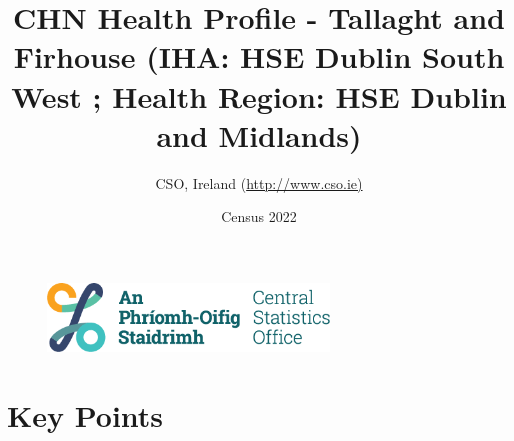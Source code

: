 \documentclass{article}
\title{CHN Health Profile - Tallaght and Firhouse (IHA: HSE Dublin South West ;  Health Region: HSE Dublin and Midlands) }
\date{Census 2022}
\author{CSO, Ireland  (\url{http://www.cso.ie)}}
\begin{document}


\begin{figure}
	\centering
\includegraphics[width =75mm]{../figures/CSO_Logo.png}
\end{figure}

				 
		   
						  
														  
																																													
												 
			 
\maketitle
					
													   
				 
						 
																																																																											   
				 
				  
  \pagebreak
    	    \tableofcontents

\pagebreak


\section{Key Points}
\end{document}

